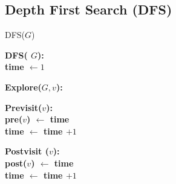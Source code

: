 \subsection{Depth First Search (DFS)}
\begin{algbox}{DFS($G$)}
  \begin{algorithm}[H]
   \bf{DFS}( $G$): \\
    time $ \leftarrow 1 $

  \end{algorithm}

  \begin{algorithm}[H]
    \bf{Explore}($G,v$): \\
  \end{algorithm}
  \begin{algorithm}[H]
    \bf{Previsit}($v$): \\
    pre($v$) $\leftarrow $ time \\
    time $\leftarrow$ time $+1$
  \end{algorithm}
 \begin{algorithm}[H]
   \bf{Postvisit} ($v$): \\ 
    post($v$) $\leftarrow $ time \\
    time $\leftarrow$ time $+1$
  \end{algorithm}


\end{algbox}

